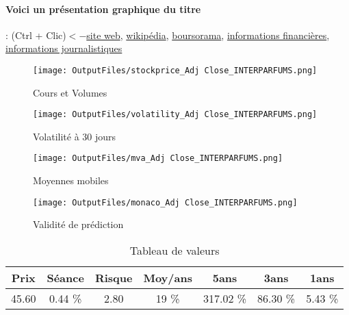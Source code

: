 \documentclass[11pt,a4paper]{report}%
\begin{document}
\paragraph{Voici un présentation graphique du titre} : (Ctrl + Clic)$<-$\href{https://www.interparfums.fr/actualites/}{site web}, \href{https://fr.wikipedia.org/wiki/Interparfums}{wikipédia}, \href{https://www.boursorama.com/cours/1rPITP}{boursorama}, \href{https://www.qwant.com/?q=site:https:%2f%2fwww.easybourse.com%2faction-societe%2fINTERPARFUMS&t=web&client=ext-firefox-hp}{informations financières}, \href{https://bourse.lerevenu.com/cours-de-bourse/fiche-valeur-synthese/INTERPARFUMS/ITP-FR}{informations journalistiques}
\begin{figure}[!htb]
   \begin{minipage}{0.5\textwidth}
     \centering
     \texttt{[image: OutputFiles/stockprice\_Adj Close\_INTERPARFUMS.png]}
     \caption{Cours et Volumes}\label{Fig:price_INTERPARFUMS}
   \end{minipage}\hfill
   \begin{minipage}{0.5\textwidth}
     \centering
     \texttt{[image: OutputFiles/volatility\_Adj Close\_INTERPARFUMS.png]}
     \caption{Volatilité à 30 jours}\label{Fig:volat_INTERPARFUMS}
   \end{minipage}
\end{figure}
\begin{figure}[!htb]
   \begin{minipage}{0.5\textwidth}
     \centering
     \texttt{[image: OutputFiles/mva\_Adj Close\_INTERPARFUMS.png]}
     \caption{Moyennes mobiles}\label{Fig:mva_INTERPARFUMS}
   \end{minipage}\hfill
   \begin{minipage}{0.5\textwidth}
     \centering
     \texttt{[image: OutputFiles/monaco\_Adj Close\_INTERPARFUMS.png]}
     \caption{Validité de prédiction}\label{Fig:prediction_INTERPARFUMS}
   \end{minipage}
\end{figure}

\begin{table}[H]
  \centering
    \begin{tabular}{|c|c|c|c|c|c|c|}
    \hline
    Prix & Séance & Risque  & Moy/ans & 5ans & 3ans & 1ans \\
    \hline
    45.60 &    0.44 \%    & 2.80 & 19 \% & 317.02 \% & 86.30 \% & 5.43 \% \\
    \hline
    \end{tabular}%
        \label{tab:table_INTERPARFUMS}%
      \caption{Tableau de valeurs}
\end{table}%
\end{document}
